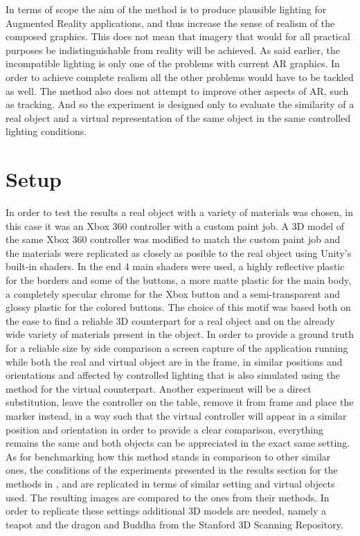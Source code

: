 
 In terms of scope the aim of the method is to produce plausible lighting for Augmented Reality applications, and thus increase the sense of realism of the composed graphics. This does not mean that imagery that would for all practical purposes be indistinguishable from reality will be achieved. As said earlier, the incompatible lighting is only one of the problems with current AR graphics. In order to achieve complete realism all the other problems would have to be tackled as well. The method also does not attempt to improve other aspects of AR, such as tracking. And so the experiment is designed only to evaluate the similarity of a real object and a virtual representation of the same object in the same controlled lighting conditions.\newline
\section{Setup}
In order to test the results a real object with a variety of materials was chosen, in this case it was an Xbox 360 controller with a custom paint job. A 3D model of the same Xbox 360 controller was modified to match the custom paint job and the materials were replicated as closely as posible to the real object using Unity's built-in shaders. In the end 4 main shaders were used, a highly reflective plastic for the borders and some of the buttons, a more matte plastic for the main body, a completely specular chrome for the Xbox button and a semi-transparent and glossy plastic for the colored buttons. The choice of this motif was based both on the ease to find a reliable 3D counterpart for a real object and on the already wide variety of materials present in the object.\newline
In order to provide a ground truth for a reliable size by side comparison a screen capture of the application running while both the real and virtual object are in the frame, in similar positions and orientations and affected by controlled lighting that is also simulated using the method for the virtual counterpart. Another experiment will be a direct substitution, leave the controller on the table, remove it from frame and place the marker instead, in a way such that the virtual controller will appear in a similar position and orientation in order to provide a clear comparison, everything remains the same and both objects can be appreciated in the exact same setting.\newline
As for benchmarking how this method stands in comparison to other similar ones, the conditions of the experiments presented in the results section for the methods in \cite{kanbara2004}, \cite{karsh2014} and \cite{pessoa2011} are replicated in terms of similar setting and virtual objects used. The resulting images are compared to the ones from their methods. In order to replicate these settings additional 3D models are needed, namely a teapot and the dragon and Buddha from the Stanford 3D Scanning Repository.\newline

